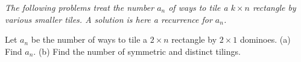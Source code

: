 \emph{The following problems treat the number $a_n$ of ways to tile a $k \times n$ rectangle by various smaller tiles. A solution is here a recurrence for $a_n$.}

Let $a_n$ be the number of ways to tile a $2 \times n$ rectangle by $2 \times 1$ dominoes. (a) Find $a_n$. (b) Find the number of symmetric and distinct tilings.

